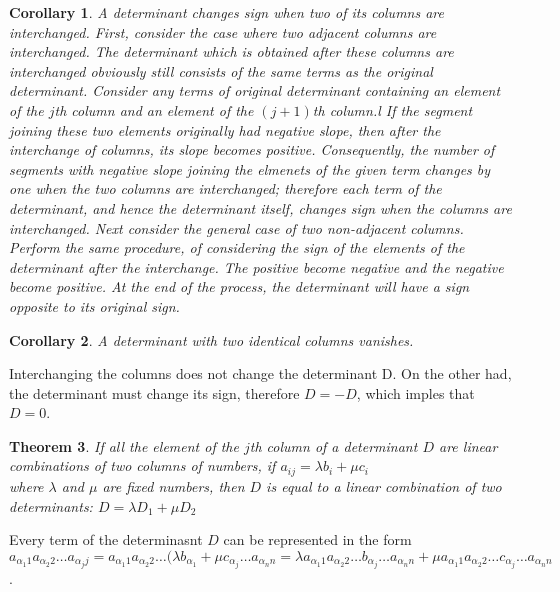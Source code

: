 \documentclass[11pt]{article} %
\newtheorem{theorem}{Theorem}[section]
\newtheorem{corollary}[theorem]{Corollary}
\newenvironment{proof}[1][Proof]{\begin{trivlist}
\item[\hskip \labelsep {\bfseries #1}]}{\end{trivlist}}
\begin{document}
\begin{corollary}
	A determinant changes sign when two of its columns are interchanged. First, consider the case where two adjacent columns are interchanged. The determinant which is obtained after these columns are interchanged obviously still consists of the same terms as the original determinant. Consider any terms of original determinant containing an element of the $j$th column and an element of the $(j+1)$th column.l If the segment joining these two elements originally had negative slope, then after the interchange of columns, its slope becomes positive. Consequently, the number of segments with negative slope joining the elmenets of the given term changes by one when the two columns are interchanged; therefore each term of the determinant, and hence the determinant itself, changes sign when the columns are interchanged. Next consider the general case of two non-adjacent columns. Perform the same procedure, of considering the sign of the elements of the determinant after the interchange. The positive become negative and the negative become positive. At the end of the process, the determinant will have a sign opposite to its original sign. 
\end{corollary}

\begin{corollary}
	A determinant with two identical columns vanishes. 
\end{corollary}

\begin{proof}
	Interchanging the columns does not change the determinant D. On the other had, the determinant must change its sign, therefore $D = -D$, which imples that $D = 0$. 
\end{proof}

\begin{theorem}
	If all the element of the $j$th column of a determinant $D$ are linear combinations of two columns of numbers, if 
	{\center
		$a_{ij} = \lambda b_i + \mu c_i $ \\
	}
where $\lambda$ and $\mu$ are fixed numbers, then $D$ is equal to a linear combination of two determinants:
	{\center
		$D = \lambda D_1 + \mu D_2 $
	\\ }
\end{theorem}

\begin{proof}
	Every term of the determinasnt $D$ can be represented in the form $a_{{\alpha_1}1}a_{{\alpha_2}2}\ldots a_{{\alpha_j}j} = a_{{\alpha_1}1}a_{{\alpha_2}2}\ldots (\lambda b_{\alpha_1} + \mu c_{\alpha_j} \ldots a_{{\alpha_n}n} = \lambda a_{{\alpha_1}1}a_{{\alpha_2}2}\ldots b_{\alpha_j}\ldots a_{{\alpha_n}n} +  \mu a_{{\alpha_1}1}a_{{\alpha_2}2}\ldots c_{\alpha_j}\ldots a_{{\alpha_n}n}$. 
\end{proof}
\end{document}
